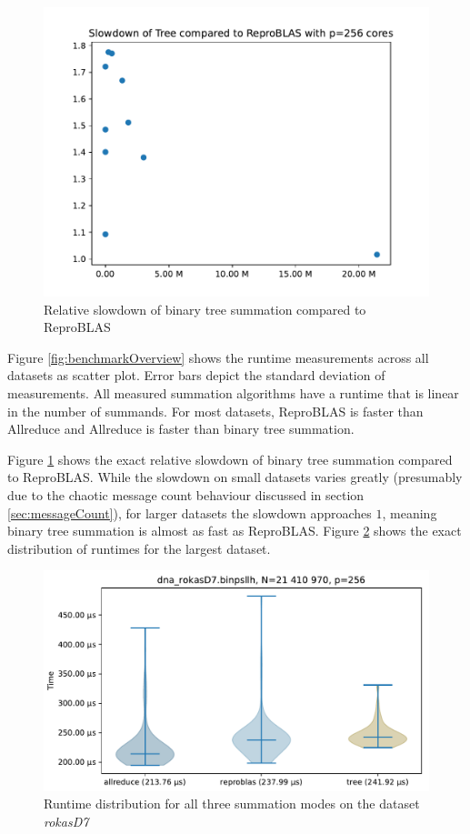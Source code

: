 \begin{figure}
\centering
\includegraphics[scale=0.8]{figures/slowdownPlot.pdf}
\caption{Relative slowdown of binary tree summation compared to ReproBLAS}
\label{fig:slowdownPlot}
\end{figure}

Figure \ref{fig:benchmarkOverview} shows the runtime measurements across all datasets as scatter plot.
Error bars depict the standard deviation of measurements.
All measured summation algorithms have a runtime that is linear in the number of summands. For most datasets, ReproBLAS is faster than Allreduce and Allreduce is faster than binary tree summation.

Figure \ref{fig:slowdownPlot} shows the exact relative slowdown of binary tree summation compared to ReproBLAS.
While the slowdown on small datasets varies greatly (presumably due to the chaotic message count behaviour discussed in section \ref{sec:messageCount}), for larger datasets the slowdown approaches $1$, meaning binary tree summation is almost as fast as ReproBLAS.
Figure \ref{fig:violinRokasD7} shows the exact distribution of runtimes for the largest dataset.


\begin{figure}
\centering
\includegraphics[scale=0.8]{figures/violinRokasD7.pdf}
\caption{Runtime distribution for all three summation modes on the dataset \textit{rokasD7}}
\label{fig:violinRokasD7}
\end{figure}


